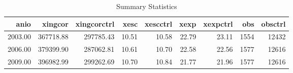 \begin{table}[H]
\centering
\caption{Summary Statistics} 
\label{tab:summ_stat}
\begin{tabular}{rrrrrrrrr}
  \hline
anio & xingcor & xingcorctrl & xesc & xescctrl & xexp & xexpctrl & obs & obsctrl \\ 
  \hline
2003.00 & 367718.88 & 297785.43 & 10.51 & 10.58 & 22.79 & 23.11 & 1554 & 12432 \\ 
  2006.00 & 379399.90 & 287062.81 & 10.61 & 10.70 & 22.58 & 22.56 & 1577 & 12616 \\ 
  2009.00 & 396982.99 & 299262.69 & 10.70 & 10.84 & 21.77 & 21.96 & 1577 & 12616 \\ 
   \hline
\end{tabular}
\end{table}
